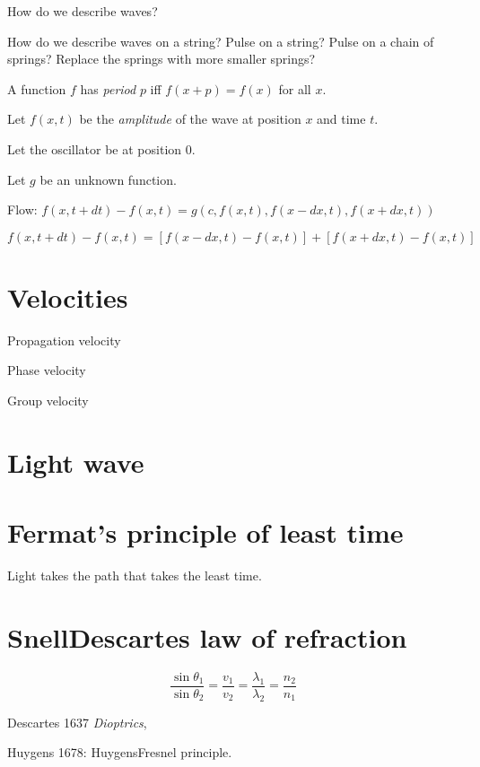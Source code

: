 How do we describe waves?

How do we describe waves on a string?
Pulse on a string?
Pulse on a chain of springs?
Replace the springs with more smaller springs?


A function \(f\) has \emph{period} \(p\) iff \(f(x+p) = f(x)\) for all \(x\).

Let \(f(x,t)\) be the \emph{amplitude} of the wave at position \(x\) and time \(t\).

Let the oscillator be at position \(0\).

Let \(g\) be an unknown function.

Flow:
\(f(x,t + dt) - f(x,t) = g(c,f(x,t),f(x-dx,t),f(x+dx,t))\)

\(f(x,t + dt) - f(x,t) = [f(x-dx,t)-f(x,t)] + [f(x+dx,t)-f(x,t)]\)

\section{Velocities}

Propagation velocity

Phase velocity

Group velocity

\section{Light wave}

\section{Fermat's principle of least time}

Light takes the path that takes the least time.

\section{Snell\textendash{}Descartes law of refraction}

\begin{equation}
    \frac{\sin \theta_1}{\sin \theta_2} = \frac{v_1}{v_2} = \frac{\lambda_1}{\lambda_2} = \frac{n_2}{n_1}
\end{equation}

Descartes 1637 \emph{Dioptrics},

Huygens 1678: Huygens\textendash{}Fresnel principle.

